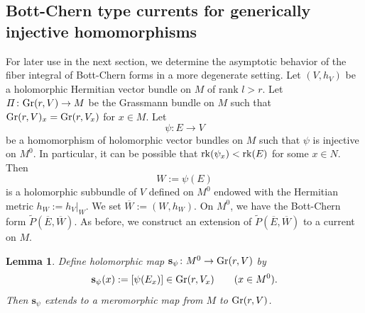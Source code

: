 \documentclass[amscd, leqno]{amsart}
\theoremstyle{plain}
\newtheorem{lemma}[theorem]{Lemma}
\theoremstyle{definition}
\theoremstyle{remark}
\begin{document}
\subsection
{Bott-Chern type currents for generically injective homomorphisms}
\label{sect:6.5}
\par
For later use in the next section, we determine the asymptotic behavior of the fiber integral of Bott-Chern forms in a more degenerate setting.
Let $(V, h_{V})$ be a holomorphic Hermitian vector bundle on $M$ of rank $l > r$. 
Let $\varPi \colon {\rm Gr}(r, V) \to M$ be the Grassmann bundle on $M$ such that ${\rm Gr}(r, V)_{x} = {\rm Gr}(r, V_{x})$ for $x \in M$. 
Let
$$
\psi \colon E \to V
$$
be a homomorphism of holomorphic vector bundles on $M$ such that $\psi$ is injective on $M^{0}$. In particular, it can be possible that 
${\rm rk}(\psi_{x}) < {\rm rk}(E)$ for some $x \in N$. Then 
$$
W := \psi(E)
$$ 
is a holomorphic subbundle of $V$ defined on $M^{0}$ endowed with the Hermitian metric $h_{W} := h_{V}|_{W}$. 
We set $\overline{W} := (W, h_{W})$. On $M^{0}$, we have the Bott-Chern form $\widetilde{P}(\overline{E}, \overline{W})$.
As before, we construct an extension of $\widetilde{P}(\overline{E}, \overline{W})$ to a current on $M$.



\begin{lemma}
\label{lemma:mer:extension}
Define holomorphic map ${\mathbf s}_{\psi} \colon M^{0} \to {\rm Gr}(r, V)$ by
$$
{\mathbf s}_{\psi}(x) := [ \psi(E_{x}) ] \in {\rm Gr}(r, V_{x})
\qquad
(x \in M^{0}).
$$
Then ${\mathbf s}_{\psi}$ extends to a meromorphic map from $M$ to ${\rm Gr}(r, V)$.
\end{lemma}
\end{document}

